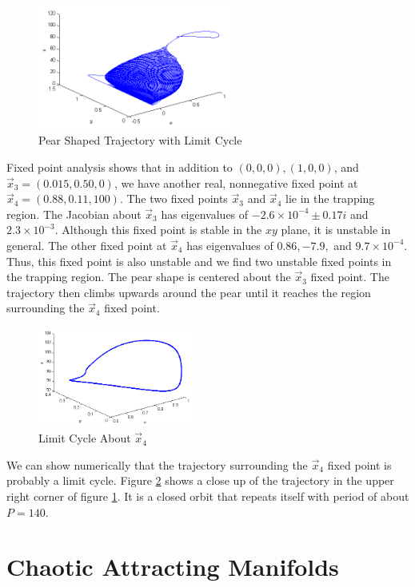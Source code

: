 \documentclass[12pt,journal,compsoc,twoside]{IEEEtran}
\begin{document}
\begin{figure}[h!]
\centering
\includegraphics[width=2.5in, trim = 10 20 10 20]{pear.png}
\caption{Pear Shaped Trajectory with Limit Cycle}
\label{pear}
\end{figure}

Fixed point analysis shows that in addition to $(0,0,0),(1,0,0)$, and $\vec{x}_3 = (0.015, 0.50, 0)$, we have another real, nonnegative fixed point at $\vec{x}_4 = (0.88, 0.11, 100)$. The two fixed points $\vec{x}_3$ and $\vec{x}_4$ lie in the trapping region. The Jacobian about $\vec{x}_3$ has eigenvalues of $-2.6 \times 10^{-4} \pm 0.17i$ and $2.3 \times 10^{-3}$. Although this fixed point is stable in the $xy$ plane, it is unstable in general. The other fixed point at $\vec{x}_4$ has eigenvalues of $0.86, -7.9,$ and $9.7 \times 10^{-4}$. Thus, this fixed point is also unstable and we find two unstable fixed points in the trapping region. The pear shape is centered about the $\vec{x}_3$ fixed point. The trajectory then climbs upwards around the pear until it reaches the region surrounding the $\vec{x}_4$ fixed point. 

\begin{figure}[h!]
\centering
\includegraphics[width=2in, trim = 10 20 10 20]{limitcycle.png}
\caption{Limit Cycle About $\vec{x}_4$}
\label{limitcycle}
\end{figure}

We can show numerically that the trajectory surrounding the $\vec{x}_4$ fixed point is probably a limit cycle. Figure \ref{limitcycle} shows a close up of the trajectory in the upper right corner of figure \ref{pear}. It is a closed orbit that repeats itself with period of about $P = 140$. 

\section{Chaotic Attracting Manifolds}
\end{document}
